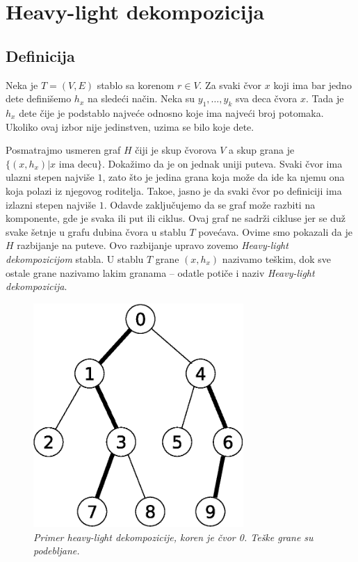 \section{Heavy-light dekompozicija}

\subsection{Definicija}

Neka je $T = (V,E)$ stablo sa korenom $r \in V$. Za svaki \v cvor $x$ koji ima bar jedno dete defini\v semo $h_x$ na slede\' ci na\v cin. Neka su $y_1, \ldots, y_k$ sva deca \v cvora $x$. Tada je $h_x$ dete \v cije je podstablo najve\' ce odnosno koje ima najve\' ci broj potomaka. Ukoliko ovaj izbor nije jedinstven, uzima se bilo koje dete.

Posmatrajmo usmeren graf $H$ \v ciji je skup \v cvorova $V$ a skup grana je $\{(x, h_x) | x \text{ ima decu}\}$. Doka\v zimo da je on jednak uniji puteva. Svaki \v cvor ima ulazni stepen najvi\v se $1$, zato \v sto je jedina grana koja mo\v ze da ide ka njemu ona koja polazi iz njegovog roditelja. Tako\dj e, jasno je da svaki \v cvor po definiciji ima izlazni stepen najvi\v se $1$. Odavde zaklju\v cujemo da se graf mo\v ze razbiti na komponente, gde je svaka ili put ili ciklus. Ovaj graf ne sadr\v zi cikluse jer se du\v z svake \v setnje u grafu dubina \v cvora u stablu $T$ pove\' cava. Ovime smo pokazali da je $H$ razbijanje na puteve. Ovo razbijanje upravo zovemo \textit{Heavy-light dekompozicijom} stabla. U stablu $T$ grane $(x, h_x)$ nazivamo te\v skim, dok sve ostale grane nazivamo lakim granama -- odatle poti\v ce i naziv \textit{Heavy-light dekompozicija}.

\begin{figure}[H]
    \centering
    \includegraphics[width=80mm]{../img/hld.eps}
    \caption*{\textit{Primer heavy-light dekompozicije, koren je \v cvor 0. Te\v ske grane su podebljane.}}
\end{figure}

